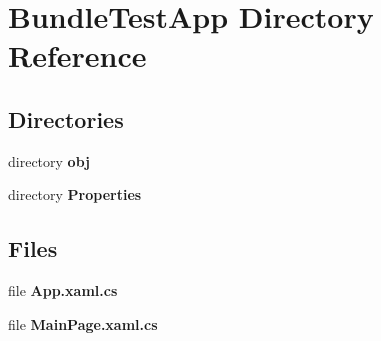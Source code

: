 \section{Bundle\+Test\+App Directory Reference}
\label{dir_4ec9398213b1b0ab2c2a39025296e5a3}
\subsection*{Directories}
\begin{DoxyCompactItemize}
\item 
directory {\bf obj}
\item 
directory {\bf Properties}
\end{DoxyCompactItemize}
\subsection*{Files}
\begin{DoxyCompactItemize}
\item 
file {\bfseries App.\+xaml.\+cs}
\item 
file {\bfseries Main\+Page.\+xaml.\+cs}
\end{DoxyCompactItemize}
